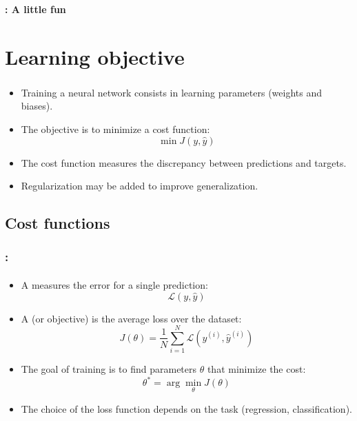 \documentclass[xcolor=table]{beamer}
\begin{document}
\begin{frame}
	\frametitle{\insertshortsubtitle}
	\framesubtitle{\insertsection: A little fun}
	
	
\end{frame}


\section{Learning objective}

\begin{frame}
	\frametitle{\insertshortsubtitle}
	\framesubtitle{\insertsection}
	
	\begin{itemize}
		\item Training a neural network consists in learning parameters (weights and biases).
		
		\item The objective is to minimize a cost function:
		\[
		\min J(y, \hat{y})
		\]
		
		\item The cost function measures the discrepancy between predictions and targets.
		
		\item Regularization may be added to improve generalization.
	\end{itemize}
	
\end{frame}


\subsection{Cost functions}

\begin{frame}
	\frametitle{\insertshortsubtitle: \insertsection}
	\framesubtitle{\insertsubsection}
	
	\begin{itemize}
		\item A  measures the error for a single prediction:
		\[
		\mathcal{L}(y, \hat{y})
		\]
		
		\item A  (or objective) is the average loss over the dataset:
		\[
		J(\theta) = \frac{1}{N} \sum_{i=1}^{N} \mathcal{L}(y^{(i)}, \hat{y}^{(i)})
		\]
		
		\item The goal of training is to find parameters $\theta$ that minimize the cost:
		\[
		\theta^* = \arg\min_{\theta} J(\theta)
		\]
		
		\item The choice of the loss function depends on the task (regression, classification).
	\end{itemize}
	
\end{frame}
\end{document}

